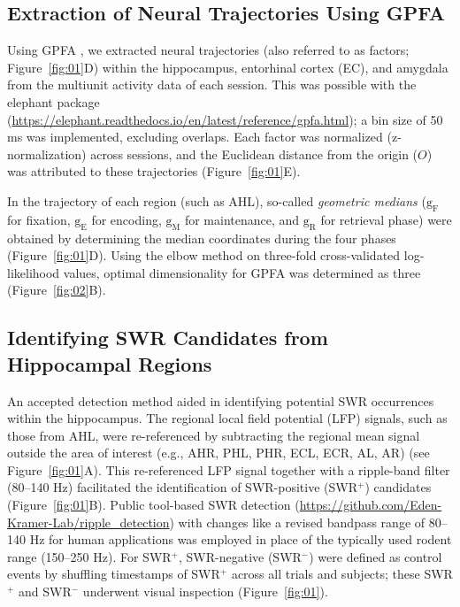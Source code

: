 \documentclass[final,3p,times,twocolumn]{elsarticle}
\begin{document}
\subsection{Extraction of Neural Trajectories Using GPFA}
Using GPFA \cite{yu_gaussian-process_2009}, we extracted neural trajectories (also referred to as factors; Figure~\ref{fig:01}D) within the hippocampus, entorhinal cortex (EC), and amygdala from the multiunit activity data of each session. This was possible with the elephant package (\url{https://elephant.readthedocs.io/en/latest/reference/gpfa.html}); a bin size of 50 ms was implemented, excluding overlaps. Each factor was normalized (z-normalization) across sessions, and the Euclidean distance from the origin ($O$) was attributed to these trajectories (Figure~\ref{fig:01}E).

In the trajectory of each region (such as AHL), so-called \textit{geometric medians} ($\mathrm{g_{F}}$ for fixation, $\mathrm{g_{E}}$ for encoding, $\mathrm{g_{M}}$ for maintenance, and $\mathrm{g_{R}}$ for retrieval phase) were obtained by determining the median coordinates during the four phases (Figure~\ref{fig:01}D). Using the elbow method on three-fold cross-validated log-likelihood values, optimal dimensionality for GPFA was determined as three (Figure~\ref{fig:02}B).

\subsection{Identifying SWR Candidates from Hippocampal Regions}
An accepted detection method \cite{liu_consensus_2022} aided in identifying potential SWR occurrences within the hippocampus. The regional local field potential (LFP) signals, such as those from AHL, were re-referenced by subtracting the regional mean signal outside the area of interest (e.g., AHR, PHL, PHR, ECL, ECR, AL, AR) (see Figure~\ref{fig:01}A). This re-referenced LFP signal together with a ripple-band filter (80--140 Hz) facilitated the identification of SWR-positive (SWR$^+$) candidates (Figure~\ref{fig:01}B). Public tool-based SWR detection (\url{https://github.com/Eden-Kramer-Lab/ripple_detection}) \cite{kay_hippocampal_2016} with changes like a revised bandpass range of 80--140 Hz for human applications \cite{norman_hippocampal_2019,norman_hippocampal_2021} was employed in place of the typically used rodent range (150--250 Hz). For SWR$^+$, SWR-negative (SWR$^-$) were defined as control events by shuffling timestamps of SWR$^+$ across all trials and subjects; these SWR$^+$ and SWR$^-$ underwent visual inspection (Figure~\ref{fig:01}).
\end{document}
